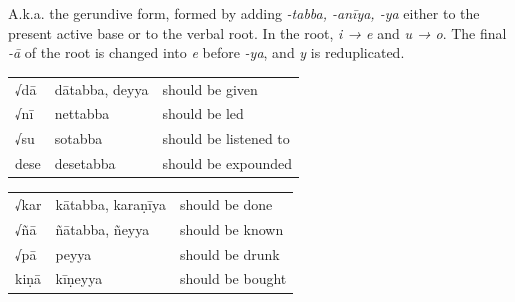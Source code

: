 \documentclass[11pt,oneside]{memoir}
\begin{document}
A.k.a. the gerundive form, formed by adding \emph{-tabba, -anīya, -ya} either to the
present active base or to the verbal root. In the root, \emph{i → e} and \emph{u → o}.
The final \emph{-ā} of the root is changed into \emph{e} before \emph{-ya}, and \emph{y} is reduplicated.

\bigskip
{\centering\par
\begin{multicols}{2}

\begin{center}
\begin{tabular}{lll}
√dā & dātabba, deyya & should be given\\
√nī & nettabba & should be led\\
√su & sotabba & should be listened to\\
dese & desetabba & should be expounded\\
\end{tabular}
\end{center}

\columnbreak

\begin{center}
\begin{tabular}{lll}
√kar & kātabba, karaṇīya & should be done\\
√ñā & ñātabba, ñeyya & should be known\\
√pā & peyya & should be drunk\\
kiṇā & kīṇeyya & should be bought\\
\end{tabular}
\end{center}

\end{multicols}
\par}

\bigskip
\end{document}

